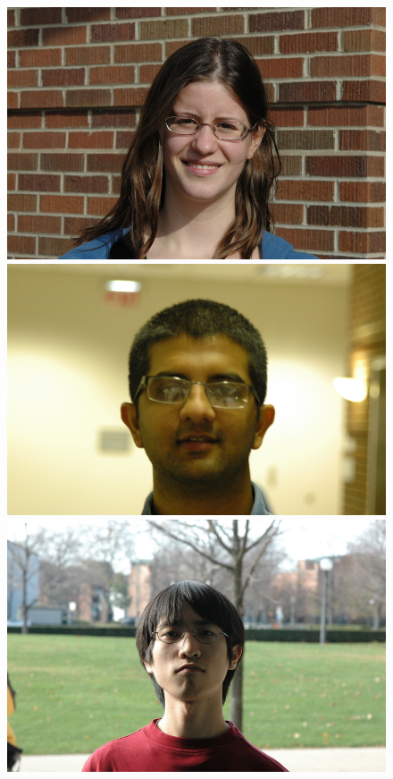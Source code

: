 \begin{figure}
\includegraphics[scale=0.35,clip=true]{figures_cvpr/examples/2/DSC_1585.JPG} 
\includegraphics[scale=0.35,clip=true]{figures_cvpr/examples/2/DSC_1588.JPG} 
\includegraphics[scale=0.35,clip=true]{figures_cvpr/examples/2/DSC_1666.JPG} 

\end{figure}
